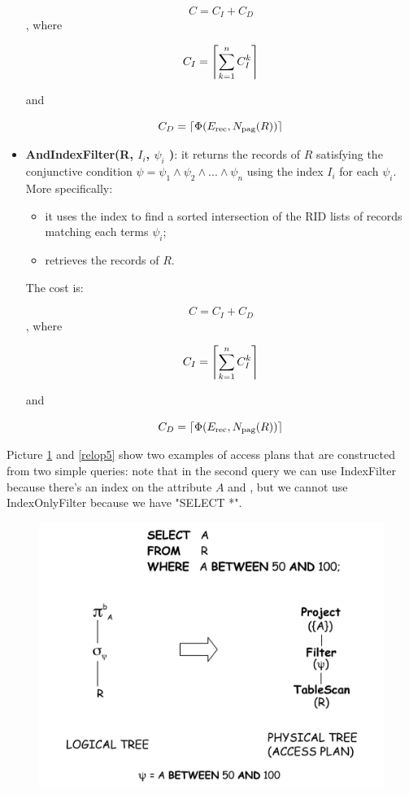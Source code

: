 \begin{itemize}
    $$
    C = C_I + C_D
    $$
    , where 

    $$
    C_I = \ceil*{\sum\limits_{k = 1}^n C_I^k }
    $$

    and 

    $$
    C_D = \ceil*{\Phi (E_{\text{rec}} , N_{\text{pag}}(R))}
    $$

    \item \textbf{AndIndexFilter(R,{ $I_i$, $\psi_i$ })}: it returns the records of $R$ satisfying the conjunctive condition $\psi = \psi_1 \land \psi_2 \land ... \land \psi_n$ using the index $I_i$ for each $\psi_i$. More specifically:
    \begin{itemize}
        \item it uses the index to find a sorted intersection of the RID lists of records matching each terms $\psi_i$;
        \item retrieves the records of $R$.
    \end{itemize}
    The cost is:

    $$
    C = C_I + C_D
    $$
    , where 

    $$
    C_I = \ceil*{\sum\limits_{k = 1}^n C_I^k }
    $$

    and 

    $$
    C_D = \ceil*{\Phi (E_{\text{rec}} , N_{\text{pag}}(R))}
    $$
    
\end{itemize}

Picture \ref{relop4} and \ref{relop5} show two examples of access plans that are constructed from two simple queries: note that in the second query we can use IndexFilter because there's an index on the attribute $A$ and , but we cannot use IndexOnlyFilter because we have "SELECT *".

\begin{figure}[h!]
		\centering
		\includegraphics[scale = 0.7]{img/relop4.jpg}
		\label{relop4}
\end{figure}

